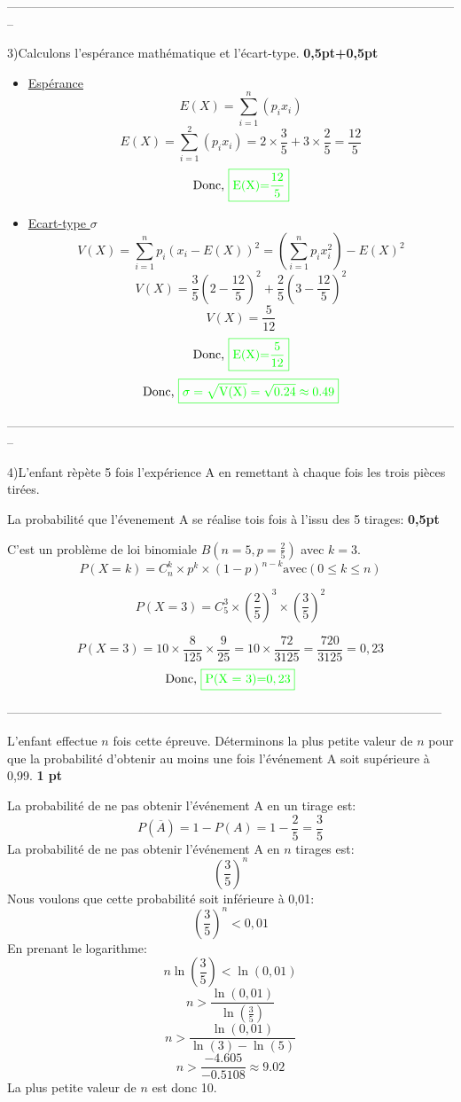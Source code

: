\documentclass[12pt]{article}
\begin{document}
--------------------------------------------------------------------------------------------------------------

3)Calculons l'espérance mathématique et l'écart-type. \textbf{0,5pt+0,5pt}
\begin{itemize}
\item \underline{Espérance}
\[E(X)=\sum_{i=1}^{n}(p_{i}x_{i})\]
\[E(X)=\sum_{i=1}^{2}(p_{i}x_{i})=2\times \frac{3}{5}+3\times \frac{2}{5}=\frac{12}{5}\]
\[\text{Donc, }\color{green}{\boxed{\text{E(X)=}\frac{12}{5}}}\]
\item \underline{Ecart-type $\sigma$}
\[V(X)=\sum_{i=1}^{n}p_{i}(x_{i}-E(X))^{2}=\left( \sum_{i=1}^{n}p_{i}x_{i}^{2}\right) -E(X)^{2}\]
\[V(X)=\frac{3}{5}\left( 2-\frac{12}{5}\right)^{2}+\frac{2}{5}\left( 3-\frac{12}{5}\right)^{2}\]
\[V(X)=\frac{5}{12}\]
\[\text{Donc, }\color{green}{\boxed{\text{E(X)=}\frac{5}{12}}}\]
\[
\text{Donc, }\color{green}{\boxed{\sigma = \sqrt{\text{V(X)}} = \sqrt{0.24} \approx 0.49}}
\]
\end{itemize}

--------------------------------------------------------------------------------------------------------------

4)L'enfant rèpète 5 fois l'expérience A en remettant à chaque fois les trois pièces tirées.

La probabilité que l'évenement A se réalise tois fois à l'issu des 5 tirages: \textbf{0,5pt}

C'est un problème de loi binomiale \(B(n = 5, p = \frac{2}{5})\) avec \(k = 3\).
\[P(X=k)=C_{n}^{k}\times p^{k}\times (1-p)^{n-k} \text{avec} (0\leq k\leq n)\] 

\[P(X=3)=C_{5}^{3}\times \left( \frac{2}{5}\right )^{3}\times \left( \frac{3}{5}\right) ^{2}\]

\[
P(X = 3) = 10 \times \frac{8}{125} \times \frac{9}{25} = 10 \times \frac{72}{3125} = \frac{720}{3125} = 0,23
\]
\[\text{Donc, }\color{green}{\boxed{\text{P(X = 3)=}0,23}}\]

---------------------------------------------------------------------------------------------------------

L'enfant effectue \(n\) fois cette épreuve. Déterminons la plus petite valeur de \(n\) pour que la probabilité d'obtenir au moins une fois l'événement A soit supérieure à 0,99. \textbf{1 pt}

La probabilité de ne pas obtenir l'événement A en un tirage est:
\[
P(\overline{A})=1-P(A)=1 - \frac{2}{5} = \frac{3}{5}
\]
La probabilité de ne pas obtenir l'événement A en \(n\) tirages est:
\[
\left(\frac{3}{5}\right)^n
\]
Nous voulons que cette probabilité soit inférieure à 0,01:
\[
\left(\frac{3}{5}\right)^n < 0,01
\]
En prenant le logarithme:
\[
n \ln\left(\frac{3}{5}\right) < \ln(0,01)
\]
\[
n > \frac{\ln(0,01)}{\ln\left(\frac{3}{5}\right)}
\]
\[
n > \frac{\ln(0,01)}{\ln(3) - \ln(5)}
\]
\[
n > \frac{-4.605}{-0.5108} \approx 9.02
\]
La plus petite valeur de \(n\) est donc 10.
\end{document}
